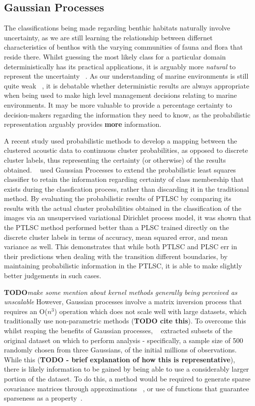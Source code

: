 \documentclass[12pt]{article}
\begin{document}
            \subsection{Gaussian Processes}
            The classifications being made regarding benthic habitats naturally involve uncertainty, as we are still learning the relationship between differnet characteristics of benthos with the varying communities of fauna and flora that reside there. Whilst guessing the most likely class for a particular domain deterministically has its practical applications, it is arguably more \textit{natural} to represent the uncertainty ~\citep{rasmussen06}. As our understanding of marine environments is still quite weak ~\citep{un04}, it is debatable whether deterministic results are always appropriate when being used to make high level management decisions relating to marine environments. It may be more valuable to provide a percentage certainty to decision-makers regarding the information they need to know, as the probabilistic representation arguably provides \textbf{more} information.

            A recent study used probabilistic methods to develop a mapping between the clustered acoustic data to continuous cluster probabilities, as opposed to discrete cluster labels, thus representing the certainty (or otherwise) of the results obtained. ~\citet*{bender12} used Gaussian Processes to extend the probabilistic least squares classifier to retain the information regarding certainty of class membership that exists during the classfication process, rather than discarding it in the traditional method. By evaluating the probabilistic results of PTLSC by comparing its results with the actual cluster probabilities obtained in the classification of the images via an unsupervised variational Dirichlet process model, it was shown that the PTLSC method performed better than a PLSC trained directly on the discrete cluster labels in terms of accuracy, mean squared error, and mean variance as well. This demonstrates that while both PTLSC and PLSC err in their predictions when dealing with the transition different boundaries, by maintaining probabilistic information in the PTLSC, it is able to make slightly better judgements in such cases.

            \textbf{TODO}\textit{make some mention about kernel methods generally being perceived as unscalable}
            However, Gaussian processes involve a matrix inversion process that requires an O($n^3$) operation which does not scale well with large datasets, which traditionally use non-parametric methods (\textbf{TODO cite this}). To overcome this whilst reaping the benefits of Gaussian processes, ~\citet*{bender12} extracted subsets of the original dataset on which to perform analysis - specifically, a sample size of 500 randomly chosen from three Gaussians, of the initial millions of observations. While this (\textbf{TODO - brief explanation of how this is representative}), there is likely information to be gained by being able to use a considerably larger portion of the dataset. To do this, a method would be required to generate sparse covariance matrices through approximations ~\citep*{bickel08}, or use of functions that guarantee sparseness as a property~\citep*{melkumyan09}.
\end{document}
